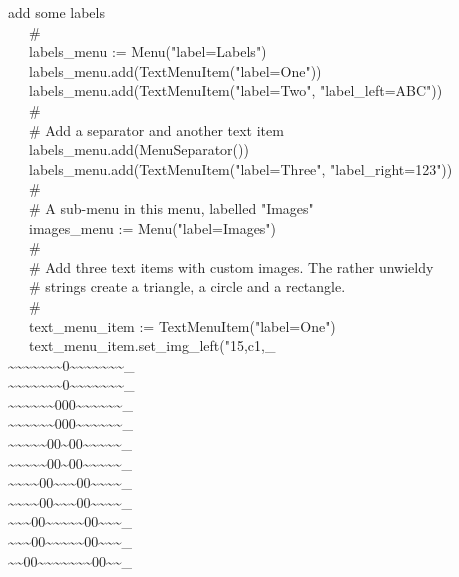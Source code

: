 {add some labels \\
\>   \ \ \ \# \\
\>   \ \ \ labels\_menu :=
Menu("label=Labels") \\
\>   \ \ \ labels\_menu.add(TextMenuItem("label=One")) \\
\>   \ \ \ labels\_menu.add(TextMenuItem("label=Two",
"label\_left=ABC")) \\
\>   \ \ \ \# \\
\>   \ \ \ \# Add a separator and another text item \\
\>   \ \ \ labels\_menu.add(MenuSeparator()) \\
\>   \ \ \ labels\_menu.add(TextMenuItem("label=Three",
"label\_right=123")) \\
\>   \ \ \ \# \\
\>   \ \ \ \# A sub-menu in this menu, labelled
"Images" \\
\>   \ \ \ images\_menu :=
Menu("label=Images") \\
\>   \ \ \ \# \\
\>   \ \ \ \# Add three text items with custom images. The rather unwieldy \\
\>   \ \ \ \# strings create a triangle, a circle and a rectangle. \\
\>   \ \ \ \# \\
\>   \ \ \ text\_menu\_item :=
TextMenuItem("label=One") \\
\>   \ \ \ text\_menu\_item.set\_img\_left("15,c1,\_ \\
\~{}\~{}\~{}\~{}\~{}\~{}\~{}0\~{}\~{}\~{}\~{}\~{}\~{}\~{}\_ \\
\~{}\~{}\~{}\~{}\~{}\~{}\~{}0\~{}\~{}\~{}\~{}\~{}\~{}\~{}\_ \\
\~{}\~{}\~{}\~{}\~{}\~{}000\~{}\~{}\~{}\~{}\~{}\~{}\_ \\
\~{}\~{}\~{}\~{}\~{}\~{}000\~{}\~{}\~{}\~{}\~{}\~{}\_ \\
\~{}\~{}\~{}\~{}\~{}00\~{}00\~{}\~{}\~{}\~{}\~{}\_ \\
\~{}\~{}\~{}\~{}\~{}00\~{}00\~{}\~{}\~{}\~{}\~{}\_ \\
\~{}\~{}\~{}\~{}00\~{}\~{}\~{}00\~{}\~{}\~{}\~{}\_ \\
\~{}\~{}\~{}\~{}00\~{}\~{}\~{}00\~{}\~{}\~{}\~{}\_ \\
\~{}\~{}\~{}00\~{}\~{}\~{}\~{}\~{}00\~{}\~{}\~{}\_ \\
\~{}\~{}\~{}00\~{}\~{}\~{}\~{}\~{}00\~{}\~{}\~{}\_ \\
\~{}\~{}00\~{}\~{}\~{}\~{}\~{}\~{}\~{}00\~{}\~{}\_ \\
}
